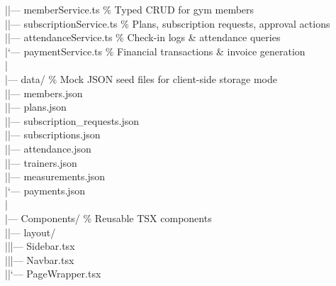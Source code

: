 \documentclass[11pt,a4paper]{article}
\begin{document}
{|\hspace{1.5em}|--- memberService.ts \hfill\textcolor{medgray}{\% Typed CRUD for gym members}\\
|\hspace{1.5em}|--- subscriptionService.ts \hfill\textcolor{medgray}{\% Plans, subscription requests, approval actions}\\
|\hspace{1.5em}|--- attendanceService.ts \hfill\textcolor{medgray}{\% Check-in logs \& attendance queries}\\
|\hspace{1.5em}`--- paymentService.ts \hfill\textcolor{medgray}{\% Financial transactions \& invoice generation}\\
|\\
|--- data/ \hfill\textcolor{medgray}{\% Mock JSON seed files for client-side storage mode}\\
|\hspace{1.5em}|--- members.json\\
|\hspace{1.5em}|--- plans.json\\
|\hspace{1.5em}|--- subscription\_requests.json\\
|\hspace{1.5em}|--- subscriptions.json\\
|\hspace{1.5em}|--- attendance.json\\
|\hspace{1.5em}|--- trainers.json\\
|\hspace{1.5em}|--- measurements.json\\
|\hspace{1.5em}`--- payments.json\\
|\\
|--- Components/ \hfill\textcolor{medgray}{\% Reusable TSX components}\\
|\hspace{1.5em}|--- layout/\\
|\hspace{1.5em}|\hspace{1.5em}|--- Sidebar.tsx\\
|\hspace{1.5em}|\hspace{1.5em}|--- Navbar.tsx\\
|\hspace{1.5em}|\hspace{1.5em}`--- PageWrapper.tsx\\
}
\end{document}
